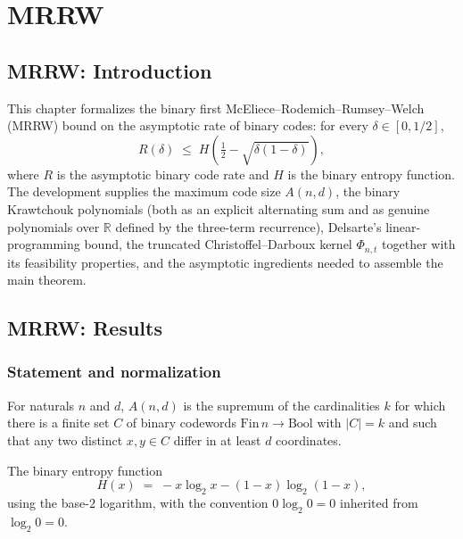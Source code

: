 \section{MRRW}
\subsection*{MRRW: Introduction}

This chapter formalizes the binary first McEliece--Rodemich--Rumsey--Welch (MRRW)
bound on the asymptotic rate of binary codes: for every $\delta \in [0,1/2]$,
\[
  R(\delta) \;\le\; H\!\left(\tfrac12 - \sqrt{\delta(1-\delta)}\right),
\]
where $R$ is the asymptotic binary code rate and $H$ is the binary entropy function.
The development supplies the maximum code size $A(n,d)$, the binary Krawtchouk
polynomials (both as an explicit alternating sum and as genuine polynomials over
$\mathbb{R}$ defined by the three-term recurrence), Delsarte's linear-programming
bound, the truncated Christoffel--Darboux kernel $\Phi_{n,t}$ together with its
feasibility properties, and the asymptotic ingredients needed to assemble the
main theorem.

\subsection*{MRRW: Results}

\subsubsection{Statement and normalization}

\begin{definition}
\label{codeA}
\leanok
{}
For naturals $n$ and $d$, $A(n,d)$ is the supremum of the cardinalities $k$ for which
there is a finite set $C$ of binary codewords $\mathrm{Fin}\,n \to \mathrm{Bool}$ with
$|C| = k$ and such that any two distinct $x, y \in C$ differ in at least $d$
coordinates.
\end{definition}

\begin{definition}
\label{binaryEntropy}
\leanok
{}
The binary entropy function
\[
  H(x) \;=\; -x\log_2 x - (1-x)\log_2(1-x),
\]
using the base-$2$ logarithm, with the convention $0\log_2 0 = 0$ inherited from
$\log_2 0 = 0$.
\end{definition}

